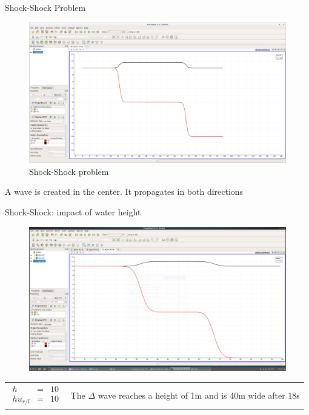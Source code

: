 \documentclass[shortpres]{beamer}
\newcommand{\imgvoffset}{-20pt}
\newcommand{\imgfullscale}{0.75}
\begin{document}
\begin{frame}{Shock-Shock Problem}
	\begin{figure}[t]
		\vspace{\imgvoffset}
		\includegraphics[clip, width=\imgfullscale\linewidth]{img/Shock-Shock.png}
		\caption*{Shock-Shock problem}
	\end{figure}
	A wave is created in the center. It propagates in both directions
\end{frame}


\begin{frame}{Shock-Shock: impact of water height}
	\begin{figure}[t]
		\vspace{\imgvoffset}
		\includegraphics[width=\imgfullscale\linewidth]{img/Shock_h10_t18.png}
		\caption*{}
	\end{figure}
	
	\begin{tabular}{m{3cm} m{\linewidth-5cm}}
		$
		\begin{matrix}
		h & = & 10\\
		hu_{r/l} & = & 10
		\end{matrix}
		$
		&
		
		The $\Delta$ wave reaches a height of 1m and is 40m wide after 18s
	\end{tabular}
\end{frame}
\end{document}

